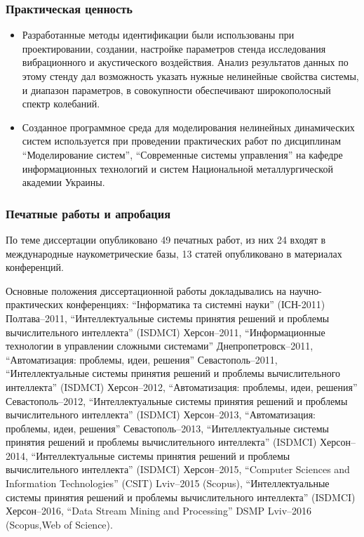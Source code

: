 \documentclass[10pt,utf8]{beamer}
\begin{document}

\begin{frame}
  \frametitle{Практическая ценность}

  \begin{itemize}

    \item
      Разработанные методы идентификации были использованы при проектировании,
      создании, настройке параметров стенда исследования вибрационного и
      акустического воздействия. Анализ результатов данных по этому стенду дал
      возможность указать нужные нелинейные свойства системы, и диапазон параметров,
      в совокупности обеспечивают широкополосный спектр колебаний.

    \item
      Созданное программное среда для моделирования нелинейных динамических систем
      используется при проведении практических работ по дисциплинам
      ``Моделирование систем'', ``Современные системы управления''
      на кафедре информационных технологий
      и систем Национальной металлургической академии Украины.

  \end{itemize}


\end{frame}




\begin{frame}
  \frametitle{Печатные работы и апробация}

По теме диссертации опубликовано
49 печатных работ,
из них
24 входят в международные наукометрические базы,
13 статей опубликовано в материалах конференций.

{\scriptsize
Основные положения диссертационной работы докладывались на
научно-практических конференциях:
``Інформатика та системні науки'' (ІСН-2011) Полтава--2011,
``Интеллектуальные системы принятия решений и проблемы вычислительного интеллекта'' (ISDMCI) Херсон--2011,
``Информационные технологии в управлении сложными системами'' Днепропетровск--2011,
``Автоматизация: проблемы, идеи, решения'' Севастополь--2011,
``Интеллектуальные системы принятия решений и проблемы вычислительного интеллекта'' (ISDMCI) Херсон--2012,
``Автоматизация: проблемы, идеи, решения'' Севастополь--2012,
``Интеллектуальные системы принятия решений и проблемы вычислительного интеллекта'' (ISDMCI) Херсон--2013,
``Автоматизация: проблемы, идеи, решения'' Севастополь--2013,
``Интеллектуальные системы принятия решений и проблемы вычислительного интеллекта'' (ISDMCI) Херсон--2014,
``Интеллектуальные системы принятия решений и проблемы вычислительного интеллекта'' (ISDMCI) Херсон--2015,
``Computer Sciences and Information Technologies'' (CSIT) Lviv--2015 (Scopus),
``Интеллектуальные системы принятия решений и проблемы вычислительного интеллекта'' (ISDMCI) Херсон--2016,
``Data Stream Mining and Processing'' DSMP Lviv--2016 (Scopus,Web of Science).
}

\end{frame}
\end{document}

